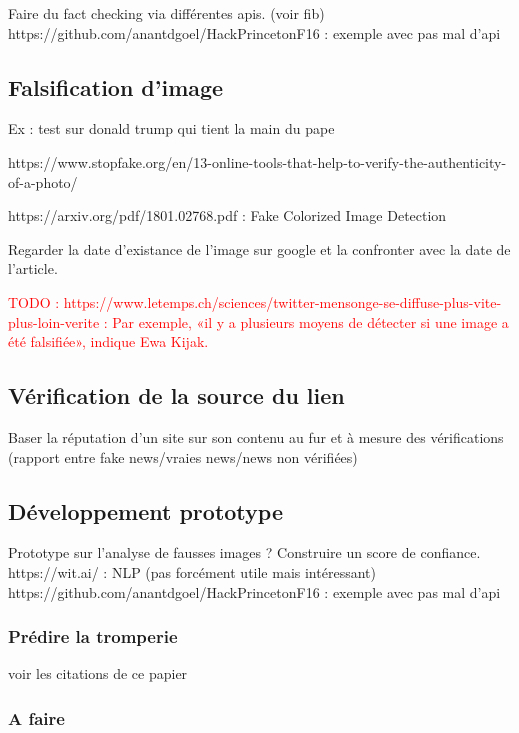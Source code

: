 \documentclass[12pt]{article}
\newcommand\todo[1]{\textcolor{red}{TODO : #1}}
\begin{document}
Faire du fact checking via différentes apis. (voir fib)
https://github.com/anantdgoel/HackPrincetonF16 : exemple avec pas mal d'api

\subsection{Falsification d'image}

Ex : test sur donald trump qui tient la main du pape

https://www.stopfake.org/en/13-online-tools-that-help-to-verify-the-authenticity-of-a-photo/

https://arxiv.org/pdf/1801.02768.pdf : Fake Colorized Image Detection

Regarder la date d'existance de l'image sur google et la confronter avec la date de l'article.

\todo{https://www.letemps.ch/sciences/twitter-mensonge-se-diffuse-plus-vite-plus-loin-verite : Par exemple, «il y a plusieurs moyens de détecter si une image a été falsifiée», indique Ewa Kijak.}


\subsection{Vérification de la source du lien}

Baser la réputation d'un site sur son contenu au fur et à mesure des vérifications (rapport entre fake news/vraies news/news non vérifiées)

\subsection{Développement prototype}

Prototype sur l'analyse de fausses images ? 
Construire un score de confiance.
https://wit.ai/ : NLP (pas forcément utile mais intéressant)
https://github.com/anantdgoel/HackPrincetonF16 : exemple avec pas mal d'api

\subsubsection{Prédire la tromperie}

\cite{conroy2015automatic} voir les citations de ce papier

\subsubsection{A faire}
\end{document}
